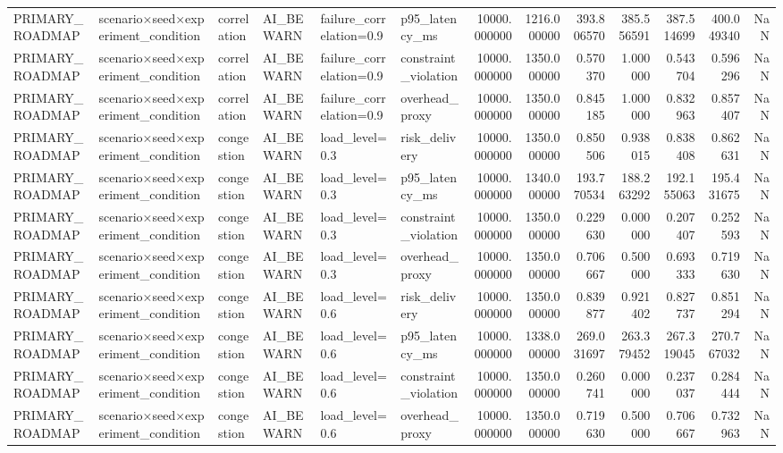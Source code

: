\begin{tabular}{llllllrrrrrrr}
PRIMARY\_ROADMAP & scenario×seed×experiment\_condition & correlation & AI\_BEWARN & failure\_correlation=0.9 & p95\_latency\_ms & 10000.000000 & 1216.000000 & 393.806570 & 385.556591 & 387.514699 & 400.049340 & NaN \\
PRIMARY\_ROADMAP & scenario×seed×experiment\_condition & correlation & AI\_BEWARN & failure\_correlation=0.9 & constraint\_violation & 10000.000000 & 1350.000000 & 0.570370 & 1.000000 & 0.543704 & 0.596296 & NaN \\
PRIMARY\_ROADMAP & scenario×seed×experiment\_condition & correlation & AI\_BEWARN & failure\_correlation=0.9 & overhead\_proxy & 10000.000000 & 1350.000000 & 0.845185 & 1.000000 & 0.832963 & 0.857407 & NaN \\
PRIMARY\_ROADMAP & scenario×seed×experiment\_condition & congestion & AI\_BEWARN & load\_level=0.3 & risk\_delivery & 10000.000000 & 1350.000000 & 0.850506 & 0.938015 & 0.838408 & 0.862631 & NaN \\
PRIMARY\_ROADMAP & scenario×seed×experiment\_condition & congestion & AI\_BEWARN & load\_level=0.3 & p95\_latency\_ms & 10000.000000 & 1340.000000 & 193.770534 & 188.263292 & 192.155063 & 195.431675 & NaN \\
PRIMARY\_ROADMAP & scenario×seed×experiment\_condition & congestion & AI\_BEWARN & load\_level=0.3 & constraint\_violation & 10000.000000 & 1350.000000 & 0.229630 & 0.000000 & 0.207407 & 0.252593 & NaN \\
PRIMARY\_ROADMAP & scenario×seed×experiment\_condition & congestion & AI\_BEWARN & load\_level=0.3 & overhead\_proxy & 10000.000000 & 1350.000000 & 0.706667 & 0.500000 & 0.693333 & 0.719630 & NaN \\
PRIMARY\_ROADMAP & scenario×seed×experiment\_condition & congestion & AI\_BEWARN & load\_level=0.6 & risk\_delivery & 10000.000000 & 1350.000000 & 0.839877 & 0.921402 & 0.827737 & 0.851294 & NaN \\
PRIMARY\_ROADMAP & scenario×seed×experiment\_condition & congestion & AI\_BEWARN & load\_level=0.6 & p95\_latency\_ms & 10000.000000 & 1338.000000 & 269.031697 & 263.379452 & 267.319045 & 270.767032 & NaN \\
PRIMARY\_ROADMAP & scenario×seed×experiment\_condition & congestion & AI\_BEWARN & load\_level=0.6 & constraint\_violation & 10000.000000 & 1350.000000 & 0.260741 & 0.000000 & 0.237037 & 0.284444 & NaN \\
PRIMARY\_ROADMAP & scenario×seed×experiment\_condition & congestion & AI\_BEWARN & load\_level=0.6 & overhead\_proxy & 10000.000000 & 1350.000000 & 0.719630 & 0.500000 & 0.706667 & 0.732963 & NaN \\

\end{tabular}

